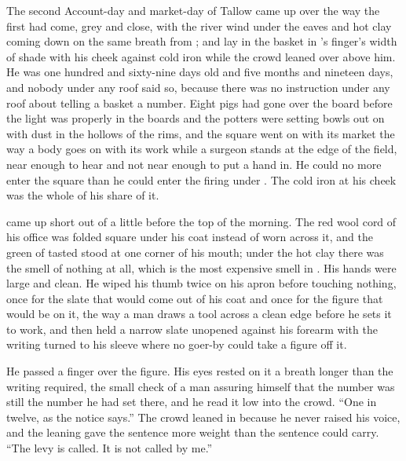 
The second Account-day and market-day of Tallow came up over  the way the first had come, grey and close, with the river wind under the eaves and hot clay coming down on the same breath from ; and  lay in the basket in 's finger's width of shade with his cheek against cold iron while the crowd leaned over  above him. He was one hundred and sixty-nine days old and five months and nineteen days, and nobody under any roof said so, because there was no instruction under any roof about telling a basket a number. Eight pigs had gone over the board before the light was properly in the boards and the potters were setting bowls out on  with dust in the hollows of the rims, and the square went on with its market the way a body goes on with its work while a surgeon stands at the edge of the field, near enough to hear and not near enough to put a hand in. He could no more enter the square than he could enter the firing under . The cold iron at his cheek was the whole of his share of it.

 came up short out of  a little before the top of the morning. The red wool cord of his office was folded square under his coat instead of worn across it, and the green of tasted  stood at one corner of his mouth; under the hot clay there was the smell of nothing at all, which is the most expensive smell in . His hands were large and clean. He wiped his thumb twice on his apron before touching nothing, once for the slate that would come out of his coat and once for the figure that would be on it, the way a man draws a tool across a clean edge before he sets it to work, and then held a narrow slate unopened against his forearm with the writing turned to his sleeve where no goer-by could take a figure off it.

He passed a finger over the figure. His eyes rested on it a breath longer than the writing required, the small check of a man assuring himself that the number was still the number he had set there, and he read it low into the crowd. “One in twelve, as the notice says.” The crowd leaned in because he never raised his voice, and the leaning gave the sentence more weight than the sentence could carry. “The levy is called. It is not called by me.”

